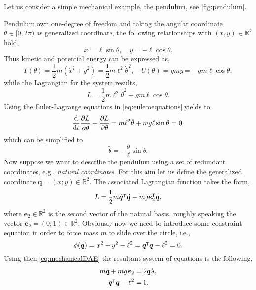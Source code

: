 		\begin{example}
			\label{ex:pendulum1}
			Let us consider a simple mechanical example, the pendulum, see \cref{fig:pendulum}. 
			
			Pendulum own one-degree of freedom and taking the angular coordinate $\theta\in[0,2\pi)$ as generalized coordinate, the following relationships with $(x,y)\in\mathbb{R}^{2}$ hold, 
			\begin{equation*}
					x = \ell\sin{\theta}, \quad y = -\ell\cos{\theta}.
			\end{equation*}
			Thus kinetic and potential energy can be expressed as, 
			\begin{equation*}
				T(\theta) = \frac{1}{2}m(\dot{x}^{2}+\dot{y}^{2}) = \frac{1}{2}m\ell^{2}\dot{\theta}^{2},\quad U(\theta) = gmy = -gm\ell\cos{\theta}, 
			\end{equation*}
			while the Lagrangian for the system results, 
			\begin{equation*}
				L = \frac{1}{2}m\ell^{2}\dot{\theta}^{2} + gm\ell\cos{\theta}.
			\end{equation*}
			Using the Euler-Lagrange equations in \cref{eq:euleroequations} yields to
			\begin{equation*}
				\frac{\mathop{}\!\mathrm{d}}{\mathop{}\!\mathrm{d} t}\frac{\partial L}{\partial\dot{\theta}}-\frac{\partial L}{\partial\theta} = m\ell^{2}\ddot{\theta} + mg\ell\sin{\theta} = 0,
			\end{equation*}
			which can be simplified to
			\begin{equation*}
				\ddot{\theta} = -\frac{g}{\ell}\sin{\theta}.
			\end{equation*}
			Now suppose we want to describe the pendulum using a set of redundant coordinates, e.g., \emph{natural coordinates}. For this aim let us define the generalized coordinate $\bm{q} = (x;y)\in\mathbb{R}^{2}$. The associated Lagrangian function takes the form, 
			\begin{equation*}
				L = \frac{1}{2}m\dot{\bm{q}}^{\intercal}\bm{\dot{q}} - mg\bm{e}^{\intercal}_{2}\bm{q},
			\end{equation*}
			where $\bm{e}_{2}\in\mathbb{R}^{2}$ is the second vector of the natural basis, roughly speaking the vector $\bm{e}_{2} = (0;1)\in\mathbb{R}^{2}$. Obviously now we need to introduce some constraint equation in order to force mass $m$ to slide over the circle, i.e., 
			\begin{equation*}
				\phi(\bm{q}) = x^{2}+y^{2} - \ell^{2} = \bm{q}^{\intercal}\bm{q}-\ell^{2} = 0.
			\end{equation*}
			Using then \cref{eq:mechanicalDAE} the resultant system of equations is the following, 
			\begin{subequations}
				\begin{align*}
					m\ddot{\bm{q}} + mg\bm{e}_{2} &= 2\bm{q}\lambda, \\
					\bm{q}^{\intercal}\bm{q}-\ell^{2} &= 0.
				\end{align*}
			\end{subequations}
		\end{example}
		